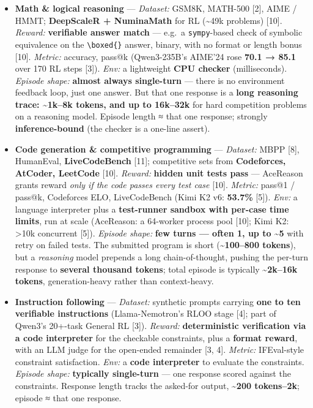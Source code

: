 \documentclass[
  paper=a4,
  ,captions=tableheading
]{scrartcl}
\providecommand{\tightlist}{%
  \setlength{\itemsep}{0pt}\setlength{\parskip}{0pt}}
\begin{document}
\begin{itemize}
\tightlist
\item
  \textbf{Math \& logical reasoning} --- \emph{Dataset:} GSM8K, MATH-500
  {[}2{]}, AIME / HMMT; \textbf{DeepScaleR + NuminaMath} for RL
  (\textasciitilde49k problems) {[}10{]}. \emph{Reward:}
  \textbf{verifiable answer match} --- e.g.~a \texttt{sympy}-based check
  of symbolic equivalence on the \texttt{\textbackslash{}boxed\{\}}
  answer, binary, with no format or length bonus {[}10{]}.
  \emph{Metric:} accuracy, pass@k (Qwen3-235B's AIME'24 rose
  \textbf{70.1 → 85.1} over 170 RL steps {[}3{]}). \emph{Env:} a
  lightweight \textbf{CPU checker} (milliseconds). \emph{Episode shape:}
  \textbf{almost always single-turn} --- there is no environment
  feedback loop, just one answer. But that one response is a
  \textbf{long reasoning trace: \textasciitilde1k--8k tokens, and up to
  16k--32k} for hard competition problems on a reasoning model. Episode
  length ≈ that one response; strongly \textbf{inference-bound} (the
  checker is a one-line assert).
\item
  \textbf{Code generation \& competitive programming} ---
  \emph{Dataset:} MBPP {[}8{]}, HumanEval, \textbf{LiveCodeBench}
  {[}11{]}; competitive sets from \textbf{Codeforces, AtCoder, LeetCode}
  {[}10{]}. \emph{Reward:} \textbf{hidden unit tests pass} --- AceReason
  grants reward \emph{only if the code passes every test case} {[}10{]}.
  \emph{Metric:} pass@1 / pass@k, Codeforces ELO, LiveCodeBench (Kimi K2
  v6: \textbf{53.7\%} {[}5{]}). \emph{Env:} a language interpreter plus
  a \textbf{test-runner sandbox with per-case time limits}, run at scale
  (AceReason: a 64-worker process pool {[}10{]}; Kimi K2:
  \textgreater10k concurrent {[}5{]}). \emph{Episode shape:} \textbf{few
  turns --- often 1, up to \textasciitilde5} with retry on failed tests.
  The submitted program is short (\textbf{\textasciitilde100--800
  tokens}), but a \emph{reasoning} model prepends a long
  chain-of-thought, pushing the per-turn response to \textbf{several
  thousand tokens}; total episode is typically
  \textbf{\textasciitilde2k--16k tokens}, generation-heavy rather than
  context-heavy.
\item
  \textbf{Instruction following} --- \emph{Dataset:} synthetic prompts
  carrying \textbf{one to ten verifiable instructions} (Llama-Nemotron's
  RLOO stage {[}4{]}; part of Qwen3's 20+-task General RL {[}3{]}).
  \emph{Reward:} \textbf{deterministic verification via a code
  interpreter} for the checkable constraints, plus a \textbf{format
  reward}, with an LLM judge for the open-ended remainder {[}3, 4{]}.
  \emph{Metric:} IFEval-style constraint satisfaction. \emph{Env:} a
  \textbf{code interpreter} to evaluate the constraints. \emph{Episode
  shape:} \textbf{typically single-turn} --- one response scored against
  the constraints. Response length tracks the asked-for output,
  \textbf{\textasciitilde200 tokens--2k}; episode ≈ that one response.
\end{itemize}
\end{document}
